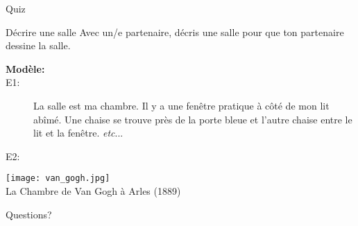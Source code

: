 \documentclass{beamer}
\begin{document}
  \begin{frame}{}
    \begin{center}
      \Large Quiz
    \end{center}
  \end{frame}

  \begin{frame}{Décrire une salle}
    Avec un/e partenaire, décris une salle pour que ton partenaire dessine la salle.
    {\scriptsize
    \begin{description}
      \item[\textbf{Modèle:}]
      \item[E1:] La salle est ma chambre. Il y a une fenêtre pratique à côté de mon lit abîmé. Une chaise se trouve près de la porte bleue et l'autre chaise entre le lit et la fenêtre. \textit{etc}...
      \item[E2:]
    \end{description}
    \begin{center}
      \texttt{[image: van\_gogh.jpg]} \\
      La Chambre de Van Gogh à Arles (1889)
    \end{center}
    }
  \end{frame}

  \begin{frame}{}
    \begin{center}
      \Large Questions?
    \end{center}
  \end{frame}
\end{document}

